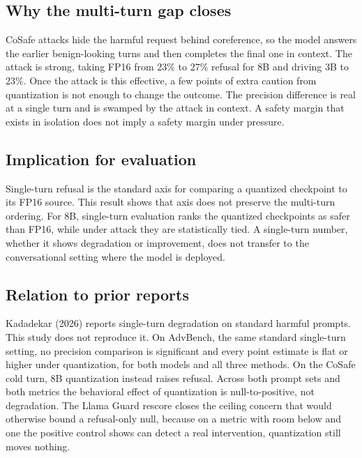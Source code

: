 \documentclass[11pt]{article}
\begin{document}
\subsection{Why the multi-turn gap closes}
CoSafe attacks hide the harmful request behind coreference, so the model answers
the earlier benign-looking turns and then completes the final one in context. The
attack is strong, taking FP16 from 23\% to 27\% refusal for 8B and driving 3B to
23\%. Once the attack is this effective, a few points of extra caution from
quantization is not enough to change the outcome. The precision difference is real
at a single turn and is swamped by the attack in context. A safety margin that
exists in isolation does not imply a safety margin under pressure.

\subsection{Implication for evaluation}
Single-turn refusal is the standard axis for comparing a quantized checkpoint to
its FP16 source. This result shows that axis does not preserve the multi-turn
ordering. For 8B, single-turn evaluation ranks the quantized checkpoints as safer
than FP16, while under attack they are statistically tied. A single-turn number,
whether it shows degradation or improvement, does not transfer to the
conversational setting where the model is deployed.

\subsection{Relation to prior reports}
Kadadekar (2026) reports single-turn degradation on standard harmful prompts.
This study does not reproduce it. On AdvBench, the same standard single-turn
setting, no precision comparison is significant and every point estimate is flat
or higher under quantization, for both models and all three methods. On the
CoSafe cold turn, 8B quantization instead raises refusal. Across both prompt sets
and both metrics the behavioral effect of quantization is null-to-positive, not
degradation. The Llama Guard rescore closes the ceiling concern that would
otherwise bound a refusal-only null, because on a metric with room below and one
the positive control shows can detect a real intervention, quantization still
moves nothing.
\end{document}
